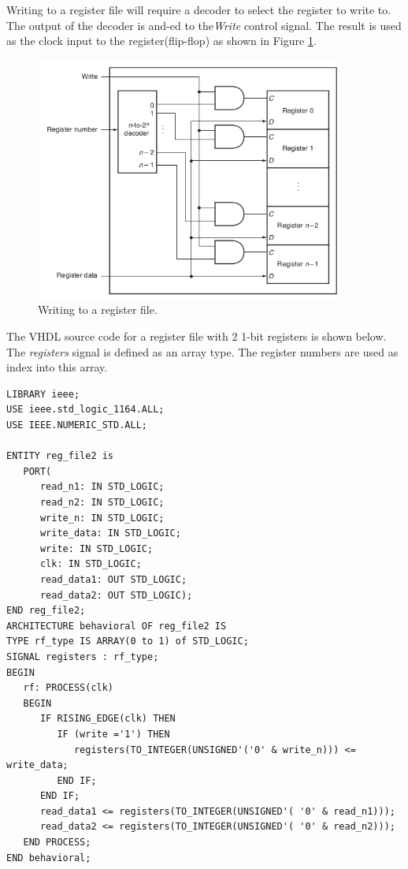 \documentclass[a4paper, 11pt,oneside]{article}
\begin{document}
Writing to a register file will require a decoder to select the register to 
write to. The output of the decoder is and-ed to the\textit{Write} control 
signal. The result is used as the clock input to the register(flip-flop) as 
shown in Figure \ref{fig:rf2}. 

\begin{figure}[H]
	\begin{center}
	\includegraphics[width=4in]{rf2.png}
	\caption{Writing to a register file.}
	\label{fig:rf2} 
	\end{center}
\end{figure}

The VHDL source code for a register file with 2 1-bit registers is shown below. 
The \textit{registers} signal is defined as an array type. The register numbers
are used as index into this array.  
\begin{verbatim}
LIBRARY ieee;
USE ieee.std_logic_1164.ALL;
USE IEEE.NUMERIC_STD.ALL;

ENTITY reg_file2 is
   PORT( 
      read_n1: IN STD_LOGIC;
      read_n2: IN STD_LOGIC;
      write_n: IN STD_LOGIC;
      write_data: IN STD_LOGIC;
      write: IN STD_LOGIC;
      clk: IN STD_LOGIC;
      read_data1: OUT STD_LOGIC;
      read_data2: OUT STD_LOGIC);
END reg_file2;
ARCHITECTURE behavioral OF reg_file2 IS
TYPE rf_type IS ARRAY(0 to 1) of STD_LOGIC;
SIGNAL registers : rf_type;
BEGIN
   rf: PROCESS(clk)
   BEGIN
      IF RISING_EDGE(clk) THEN
         IF (write ='1') THEN
            registers(TO_INTEGER(UNSIGNED'('0' & write_n))) <= write_data;
         END IF;
      END IF;
      read_data1 <= registers(TO_INTEGER(UNSIGNED'( '0' & read_n1)));
      read_data2 <= registers(TO_INTEGER(UNSIGNED'( '0' & read_n2)));
   END PROCESS;
END behavioral;
\end{verbatim}
\end{document}
